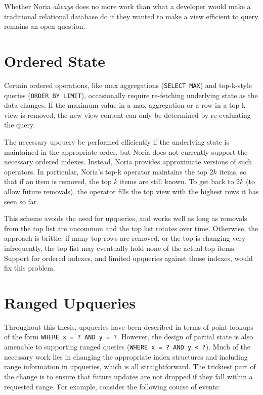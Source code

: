 
Whether Noria \emph{always} does no more work than what a developer would
make a traditional relational database do if they wanted to make a view
efficient to query remains an open question.

\section{Ordered State}
\label{s:disc:ordered}

Certain ordered operations, like max aggregations (\texttt{SELECT MAX}) and
top-k-style queries (\texttt{ORDER BY LIMIT}), occasionally require re-fetching
underlying state as the data changes. If the maximum value in a max aggregation
or a row in a top-k view is removed, the new view content can only be determined
by re-evaluating the query.

The necessary upquery be performed efficiently if the underlying state is
maintained in the appropriate order, but Noria does not currently support the
necessary ordered indexes. Instead, Noria provides approximate versions of such
operators. In particular, Noria's top-k operator maintains the top $2k$ items,
so that if an item is removed, the top $k$ items are still known. To get back to
$2k$ (to allow future removals), the operator fills the top view with the
highest rows it has seen so far.

This scheme avoids the need for upqueries, and works well as long as removals
from the top list are uncommon and the top list rotates over time. Otherwise,
the approach is brittle; if many top rows are removed, or the top is changing
very infrequently, the top list may eventually hold none of the actual top
items. Support for ordered indexes, and limited upqueries against those indexes,
would fix this problem.

\section{Ranged Upqueries}
\label{s:disc:ranged}

Throughout this thesis, upqueries have been described in terms of point lookups
of the form \texttt{WHERE x = ? AND y = ?}. However, the design of partial state
is also amenable to supporting ranged queries (\texttt{WHERE x = ? AND y < ?}).
Much of the necessary work lies in changing the appropriate index structures and
including range information in upqueries, which is all straightforward. The
trickiest part of the change is to ensure that future updates are not dropped if
they fall within a requested range. For example, consider the following course
of events:


